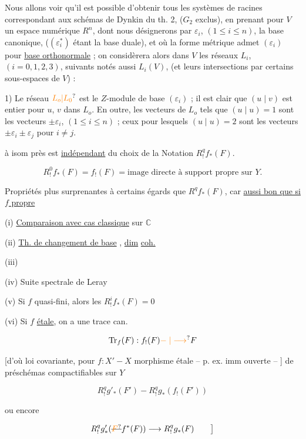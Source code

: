 Nous allons voir qu'il est possible d'obtenir tous les systèmes de racines correspondant aux schémas de Dynkin du th. 2, ($G_2$ exclus), en prenant pour $V$ un espace numérique $R^n$, dont nous désignerons par $\varepsilon_i$, $(1\leq i\leq n)$, la base canonique, ($(\varepsilon_i^*)$ étant la base duale), et où la forme métrique admet $(\varepsilon_i)$ pour \uline{base orthonormale} ; on considèrera alors dans $V$ les réseaux $L_i$, $(i=0,1,2,3)$, suivants notés aussi $L_i(V)$, (et leurs intersections par certains sous-espaces de $V$) :

1) Le réseau $\unsure{L_o|L_0}$ est le $Z$-module de base $(\varepsilon_i)$ ; il est clair que $(u\mid v)$ est entier pour $u$, $v$ dans $L_o$. En outre, les vecteurs de $L_o$ tels que $(u\mid u)=1$ sont les vecteurs $\pm\varepsilon_i$, $(1\leq i\leq n)$ ; ceux pour lesquels $(u\mid u)=2$ sont les vecteurs $\pm\varepsilon_i\pm\varepsilon_j$ pour $i\neq j$.

à isom près est \uline{indépendant} du choix de la  Notation $R^q_! f_*(F)$.

\[
R^0_! f_*(F)=f_!(F)=\text{image directe à support propre sur }Y.
\]

 Propriétés plus surprenantes à certains égards que $R^q f_*(F)$, car \uline{aussi bon que si $f$ propre}

(i) \uline{Comparaison avec cas classique} sur $\mathbb C$

(ii) \uline{Th. de changement de base} , \uline{dim} \uline{coh.}

(iii) \uline{}

(iv) Suite spectrale de Leray

(v) Si $f$ quasi-fini, alors les $R^i_! f_*(F)=0$

(vi) Si $f$ \uline{étale}, on a une trace can.

\[
\mathrm{Tr}_f(F):f_!(F)\unsure{\mathrel{-}|\longrightarrow}F
\]

[d'où loi covariante, pour $f:X'\mathrel{-}X$ morphisme étale -- p. ex. imm ouverte -- ] de préschémas compactifiables sur $Y$

\[
R^q_!g'_*(F')\mathrel{-}R^q_!g_*(f_!(F'))
\]

ou encore

\[
R^q_!g'_*(\deleted{\unsure{F}}f^*(F))\longrightarrow R^q_!g_*(F)\qquad\big]
\]

